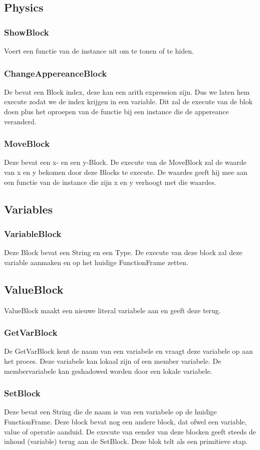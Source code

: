 \documentclass[]{article}
\begin{document}
\subsection{Physics}
\subsubsection{ShowBlock}
Voert een functie van de instance uit om te tonen of te hiden.
\subsubsection{ChangeAppereanceBlock}
De bevat een Block index, deze kan een arith expression zijn. Dus we laten hem execute zodat we de index krijgen in een variable. Dit zal de execute van de blok doen plus het oproepen van de functie bij een instance die de appereance veranderd.
\subsubsection{MoveBlock}
Deze bevat een x- en een y-Block. De execute van de MoveBlock zal de waarde van x en y bekomen door deze Blocks te execute. De waardes geeft hij mee aan een functie van de instance die zijn x en y verhoogt met die waardes.

\subsection{Variables}
\subsubsection{VariableBlock}
Deze Block bevat een String en een Type. De execute van deze block zal deze variable aanmaken en op het huidige FunctionFrame zetten.
\subsection{ValueBlock}
ValueBlock maakt een nieuwe literal variabele aan en geeft deze terug.
\subsubsection{GetVarBlock}
De GetVarBlock kent de naam van een variabele en vraagt deze variabele op aan het proces. Deze variabele kan lokaal zijn of een member variabele. De membervariabele kan geshadowed worden door een lokale variabele.
\subsubsection{SetBlock}
Deze bevat een String die de naam is van een variabele op de huidige FunctionFrame. Deze block bevat nog een andere block, dat ofwel een variable, value of operatie aanduid. De execute van eender van deze blocken geeft steeds de inhoud (variable) terug aan de SetBlock. Deze blok telt als een primitieve stap.
\end{document}
